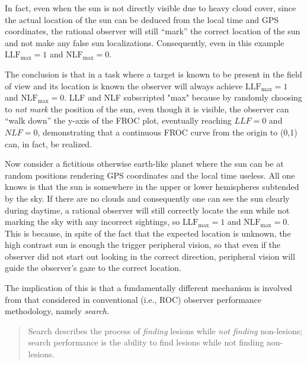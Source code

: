 \documentclass[
]{book}
\begin{document}
In fact, even when the sun is not directly visible due to heavy cloud cover, since the actual location of the sun can be deduced from the local time and GPS coordinates, the rational observer will still ``mark'' the correct location of the sun and not make any false sun localizations. Consequently, even in this example \(\text{LLF}_{\text{max}} = 1\) and \(\text{NLF}_{\text{max}} = 0\).

The conclusion is that in a task where a target is known to be present in the field of view and its location is known the observer will always achieve \(\text{LLF}_{\text{max}} = 1\) and \(\text{NLF}_{\text{max}} = 0\). LLF and NLF subscripted "max" because by randomly choosing to \emph{not mark} the position of the sun, even though it is visible, the observer can ``walk down'' the y-axis of the FROC plot, eventually reaching \(LLF = 0\) and \(NLF = 0\), demonstrating that a continuous FROC curve from the origin to (0,1) can, in fact, be realized.

Now consider a fictitious otherwise earth-like planet where the sun can be at random positions rendering GPS coordinates and the local time useless. All one knows is that the sun is somewhere in the upper or lower hemispheres subtended by the sky. If there are no clouds and consequently one can see the sun clearly during daytime, a rational observer will still correctly locate the sun while not marking the sky with any incorrect sightings, so \(\text{LLF}_{\text{max}} = 1\) and \(\text{NLF}_{\text{max}} = 0\). This is because, in spite of the fact that the expected location is unknown, the high contrast sun is enough the trigger peripheral vision, so that even if the observer did not start out looking in the correct direction, peripheral vision will guide the observer's gaze to the correct location.

The implication of this is that a fundamentally different mechanism is involved from that considered in conventional (i.e., ROC) observer performance methodology, namely \emph{search}.

\begin{quote}
Search describes the process of \emph{finding} lesions while \emph{not finding} non-lesions; search performance is the ability to find lesions while not finding non-lesions.
\end{quote}
\end{document}
